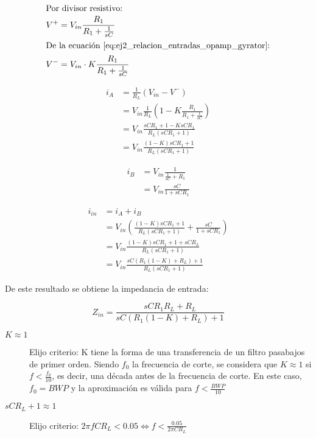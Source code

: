 \begin{align}
	\intertext{Por divisor resistivo:}
	V^+&=V_{in}\frac{R_1}{R_1+\frac{1}{sC}} \\
	\intertext{De la ecuaci\'on \ref{eq:ej2_relacion_entradas_opamp_gyrator}:}
	V^-&=V_{in}\cdot K \frac{R_1}{R_1+\frac{1}{sC}}
\end{align} 

\begin{align}
i_A &= \frac{1}{R_L}\left(V_{in} - V^-\right)\\
 &= V_{in} \frac{1}{R_L}\left( 1-K\frac{R_1}{R_1+\frac{1}{sC}} \right)\\
 &= V_{in} \frac{sCR_1+1-KsCR_1}{R_L\left( sCR_1+1 \right)} \\
 &= V_{in} \frac{(1-K)sCR_1+1}{R_L\left( sCR_1+1 \right)}
\end{align}


\begin{align}
i_B &= V_{in} \frac{1}{\frac{1}{sC} + R_1}\\
	&= V_{in} \frac{sC}{1+sCR_1}
\end{align}

\begin{align}
i_{in} &= i_A + i_B \\
 &= V_{in} \left( \frac{(1-K)sCR_1+1}{R_L\left( sCR_1+1 \right)} +   \frac{sC}{1+sCR_1}   \right) \\ 
 &= V_{in}  \frac{(1-K)sCR_1+1 + sCR_L}{R_L\left( sCR_1+1 \right)} \\
 &= V_{in}  \frac{sC(R_1(1-K)+R_L) + 1}{R_L(sCR_1+1)} 
\end{align}

De este resultado se obtiene la impedancia de entrada:

\begin{equation}
Z_{in}= \frac{ sCR_1R_L+R_L}{sC(R_1(1-K)+R_L) + 1}
\end{equation}


\begin{description}
	\item [\textbf{$K \approx 1$}] Elijo criterio: K tiene la forma de una transferencia de un filtro pasabajos de primer orden. Siendo $f_0$ la frecuencia de corte, se considera que $K\approx 1$ si $f<\frac{f_0}{10}$, es decir, una d\'ecada antes de la frecuencia de corte. En este caso, $f_0=BWP$ y la aproximaci\'on es v\'alida para $f<\frac{BWP}{10}$
	
	\item [\textbf{$sCR_L +1 \approx 1$}] Elijo criterio: $2\pi fCR_L <0.05 \iff f< \frac{0.05}{2\pi CR_L}$
\end{description}


